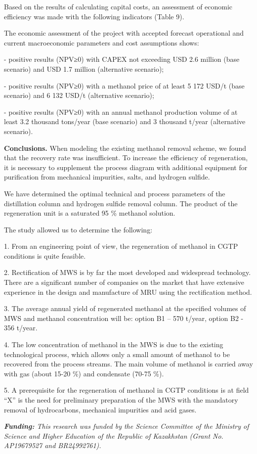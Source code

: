 \begin{multicols}{2}
Based on the results of calculating capital costs, an assessment of
economic efficiency was made with the following indicators (Table 9).

The economic assessment of the project with accepted forecast
operational and current macroeconomic parameters and cost assumptions
shows:

- positive results (NPV≥0) with CAPEX not exceeding USD 2.6 million
(base scenario) and USD 1.7 million (alternative scenario);

- positive results (NPV≥0) with a methanol price of at least 5 172 USD/t
(base scenario) and 6 132 USD/t (alternative scenario);

- positive results (NPV≥0) with an annual methanol production volume of
at least 3.2 thousand tons/year (base scenario) and 3 thousand t/year
(alternative scenario).

{\bfseries Conclusions.} When modeling the existing methanol removal
scheme, we found that the recovery rate was insufficient. To increase
the efficiency of regeneration, it is necessary to supplement the
process diagram with additional equipment for purification from
mechanical impurities, salts, and hydrogen sulfide.

We have determined the optimal technical and process parameters of the
distillation column and hydrogen sulfide removal column. The product of
the regeneration unit is a saturated 95 \% methanol solution.

The study allowed us to determine the following:

1. From an engineering point of view, the regeneration of methanol in
CGTP conditions is quite feasible.

2. Rectification of MWS is by far the most developed and widespread
technology. There are a significant number of companies on the market
that have extensive experience in the design and manufacture of MRU
using the rectification method.

3. The average annual yield of regenerated methanol at the specified
volumes of MWS and methanol concentration will be: option B1 -- 570
t/year, option B2 - 356 t/year.

4. The low concentration of methanol in the MWS is due to the existing
technological process, which allows only a small amount of methanol to
be recovered from the process streams. The main volume of methanol is
carried away with gas (about 15-20 \%) and condensate (70-75 \%).

5. A prerequisite for the regeneration of methanol in CGTP conditions is
at field ``X'' is the need for preliminary preparation of the MWS with
the mandatory removal of hydrocarbons, mechanical impurities and acid
gases.

\emph{{\bfseries Funding:} This research was funded by the Science
Committee of the Ministry of Science and Higher Education of the
Republic of Kazakhstan (Grant No. AP19679527 and BR24992761).}
\end{multicols}

